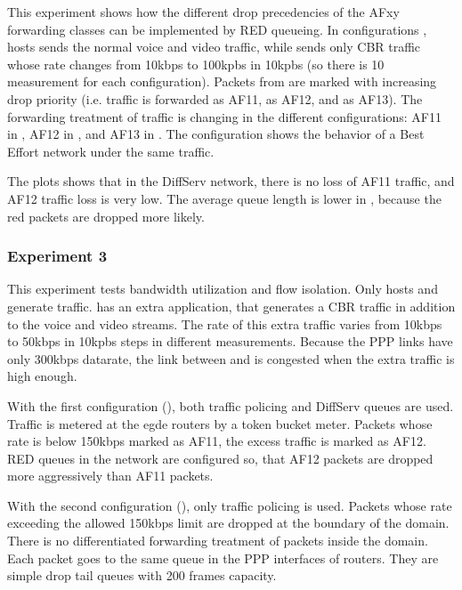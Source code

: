 This experiment shows how the different drop precedencies of the AFxy
forwarding classes can be implemented by RED queueing. In configurations
, hosts  sends the normal voice and video
traffic, while  sends only CBR traffic whose rate changes
from 10kbps to 100kpbs in 10kpbs (so there is 10 measurement for each
configuration). Packets from  are marked with
increasing drop priority (i.e.  traffic is forwarded as AF11,
 as AF12, and  as AF13). The forwarding treatment
of  traffic is changing in the different
configurations: AF11 in , AF12 in , and
AF13 in . The  configuration shows the behavior
of a Best Effort network under the same traffic.

The plots shows that in the DiffServ network, there is no loss of
AF11 traffic, and AF12 traffic loss is very low. The average queue
length is lower in , because the red packets are dropped
more likely.

\subsubsection*{Experiment 3}

This experiment tests bandwidth utilization and flow isolation.
Only hosts  and  generate traffic.  has
an extra  application, that generates a CBR
traffic in addition to the voice and video streams. The rate of
this extra traffic varies from 10kbps to 50kbps in 10kpbs steps
in different measurements. Because the PPP links have only
300kbps datarate, the link between  and  is
congested when the extra traffic is high enough.

With the first configuration (), both traffic policing
and DiffServ queues are used. Traffic is metered at the egde routers
by a token bucket meter. Packets whose rate is below 150kbps
marked as AF11, the excess traffic is marked as AF12. RED queues
in the network are configured so, that AF12 packets are dropped
more aggressively than AF11 packets.

With the second configuration (), only traffic policing
is used. Packets whose rate exceeding the allowed 150kbps limit
are dropped at the boundary of the domain. There is no differentiated
forwarding treatment of packets inside the domain. Each packet goes
to the same queue in the PPP interfaces of routers. They are simple
drop tail queues with 200 frames capacity.

